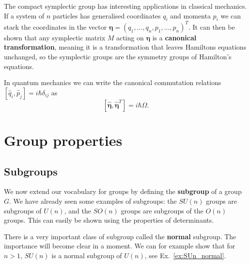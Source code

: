 \documentclass[notes.tex]{subfiles}
\begin{document}
The compact symplectic group has interesting applications in classical mechanics. If a system of $n$ particles has generalised coordinates $q_i$ and momenta $p_i$ we can stack the coordinates in the vector $\boldsymbol \eta=(q_1,\ldots,q_n,p_1,\ldots,p_n)^T$. It can then be shown that any symplectic  matrix $M$ acting on $\boldsymbol\eta$ is a {\bf canonical transformation}, meaning it is a transformation that leaves Hamiltons equations unchanged, so the symplectic groups are the symmetry groups of Hamilton's equations.

In quantum mechanics we can write the canonical commutation relations $[\hat q_i, \hat p_j]=i\hbar\delta_{ij}$ as
\[ [\hat{\boldsymbol \eta}, \hat{\boldsymbol \eta}^T]=i\hbar\Omega. \]


\section{Group properties}
\label{sec:group_properties}

\subsection{Subgroups}
We now extend our vocabulary for groups by defining the {\bf subgroup} of a group $G$.
We have already seen some examples of subgroups: the $SU(n)$ groups are subgroups of $U(n)$, and the $SO(n)$ groups are subgroups of the $O(n)$ groups. This can easily be shown using the properties of determinants.

There is a very important class of subgroup called the {\bf normal} subgroup. The importance will become clear in a moment.
We can for example show that for $n>1$, $SU(n)$ is a normal subgroup of $U(n)$, see Ex.~\ref{ex:SUn_normal}. 
\end{document}
